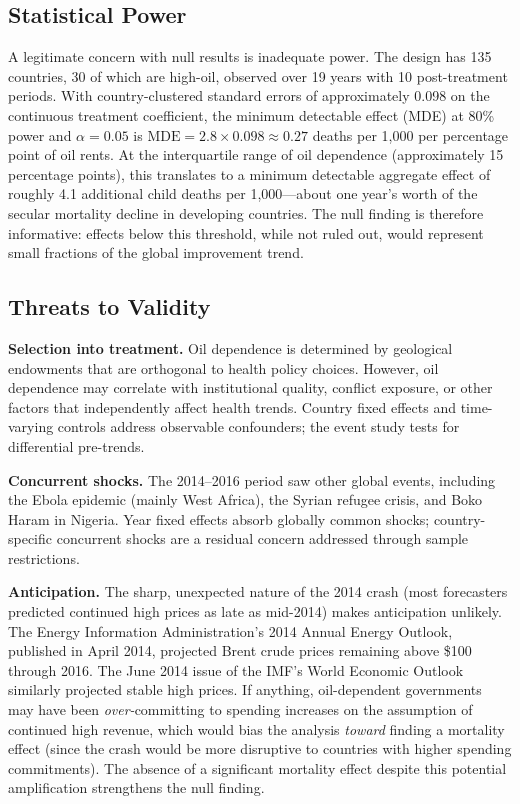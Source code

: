 \documentclass[12pt]{article}
\begin{document}
\subsection{Statistical Power}

A legitimate concern with null results is inadequate power. The design has 135 countries, 30 of which are high-oil, observed over 19 years with 10 post-treatment periods. With country-clustered standard errors of approximately 0.098 on the continuous treatment coefficient, the minimum detectable effect (MDE) at 80\% power and $\alpha = 0.05$ is $\text{MDE} = 2.8 \times 0.098 \approx 0.27$ deaths per 1,000 per percentage point of oil rents. At the interquartile range of oil dependence (approximately 15 percentage points), this translates to a minimum detectable aggregate effect of roughly 4.1 additional child deaths per 1,000---about one year's worth of the secular mortality decline in developing countries. The null finding is therefore informative: effects below this threshold, while not ruled out, would represent small fractions of the global improvement trend.

\subsection{Threats to Validity}

\textbf{Selection into treatment.} Oil dependence is determined by geological endowments that are orthogonal to health policy choices. However, oil dependence may correlate with institutional quality, conflict exposure, or other factors that independently affect health trends. Country fixed effects and time-varying controls address observable confounders; the event study tests for differential pre-trends.

\textbf{Concurrent shocks.} The 2014--2016 period saw other global events, including the Ebola epidemic (mainly West Africa), the Syrian refugee crisis, and Boko Haram in Nigeria. Year fixed effects absorb globally common shocks; country-specific concurrent shocks are a residual concern addressed through sample restrictions.

\textbf{Anticipation.} The sharp, unexpected nature of the 2014 crash (most forecasters predicted continued high prices as late as mid-2014) makes anticipation unlikely. The Energy Information Administration's 2014 Annual Energy Outlook, published in April 2014, projected Brent crude prices remaining above \$100 through 2016. The June 2014 issue of the IMF's World Economic Outlook similarly projected stable high prices. If anything, oil-dependent governments may have been \textit{over-}committing to spending increases on the assumption of continued high revenue, which would bias the analysis \textit{toward} finding a mortality effect (since the crash would be more disruptive to countries with higher spending commitments). The absence of a significant mortality effect despite this potential amplification strengthens the null finding.
\end{document}
